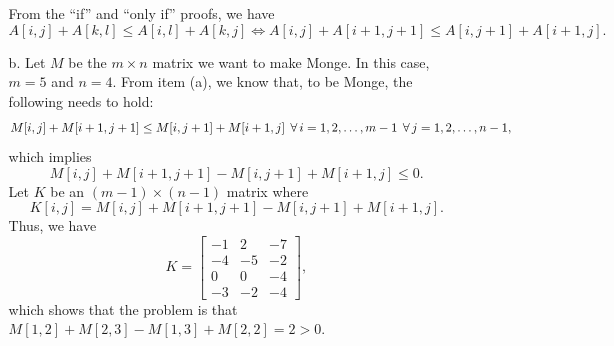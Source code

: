 \begin{enumerate}
\begin{framed}
\begin{enumerate}
      From the ``if'' and ``only if'' proofs, we have
      \[
        A[i, j] + A[k, l] \le A[i, l] + A[k, j] \iff A[i, j] + A[i + 1, j + 1] \le A[i, j + 1] + A[i + 1, j].
      \]
      \item[b.] Let $M$ be the $m \times n$ matrix we want to make Monge. In
        this case, $m = 5$ and $n = 4$. From item (a), we know that, to be
        Monge, the following needs to hold:
        \begin{equation*}
        \begin{aligned}
        M[i, j] + M[i + 1, j + 1] \le M[i, j + 1] + M[i + 1, j] \; \operatorname{\forall} i = 1, 2, \dots, m - 1 \; \operatorname{\forall} j = 1, 2, \dots, n - 1,\\
        \end{aligned}
        \end{equation*}
      which implies
      \[
        M[i, j] + M[i + 1, j + 1] - M[i, j + 1] + M[i + 1, j] \le 0.
      \]
      Let $K$ be an $(m - 1) \times (n - 1)$ matrix where
      \[
        K[i, j] = M[i, j] + M[i + 1, j + 1] - M[i, j + 1] + M[i + 1, j].
      \]
      Thus, we have
      \[
      K =
      \begin{bmatrix}
      -1 &  2 & -7\\
      -4 & -5 & -2\\
       0 &  0 & -4\\
      -3 & -2 & -4
      \end{bmatrix}
      ,\]
    which shows that the problem is that
    $M[1, 2] + M[2, 3] - M[1, 3] + M[2, 2] = 2 > 0$.


\end{enumerate}
\end{framed}
\end{enumerate}
